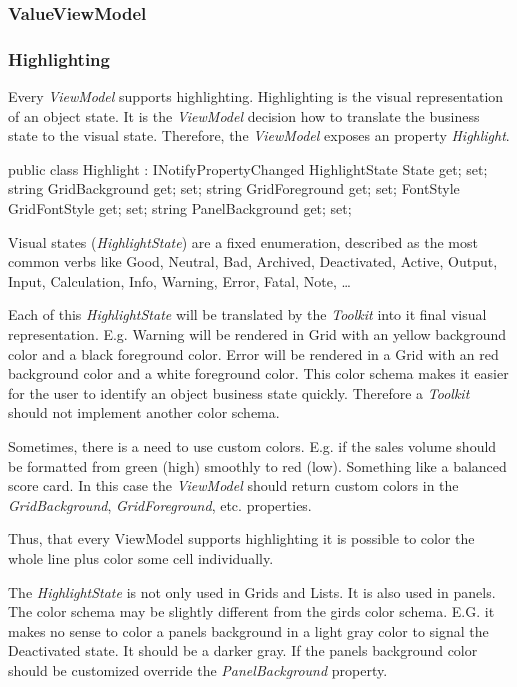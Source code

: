 \subsubsection{ValueViewModel}

\subsubsection{Highlighting}
Every \emph{ViewModel} supports highlighting. Highlighting is the visual
representation of an object state. It is the \emph{ViewModel} decision how to
translate the business state to the visual state. Therefore, the
\emph{ViewModel} exposes an property \emph{Highlight}.

\begin{CS}
public class Highlight : INotifyPropertyChanged
{
    HighlightState State { get; set; }
    string GridBackground { get; set; }
    string GridForeground { get; set; }
    FontStyle GridFontStyle { get; set; }
    string PanelBackground { get; set; }
}
\end{CS}

Visual states (\emph{HighlightState}) are a fixed enumeration, described as the
most common verbs like Good, Neutral, Bad, Archived, Deactivated, Active,
Output, Input, Calculation, Info, Warning, Error, Fatal, Note, \ldots

Each of this \emph{HighlightState} will be translated by the \emph{Toolkit} into
it final visual representation. E.g. Warning will be rendered in Grid with an
yellow background color and a black foreground color. Error will be rendered in
a Grid with an red background color and a white foreground color. This color
schema makes it easier for the user to identify an object business state
quickly. Therefore a  \emph{Toolkit} should not implement another color schema.

Sometimes, there is a need to use custom colors. E.g. if the sales volume should
be formatted from green (high) smoothly to red (low). Something like a balanced
score card. In this case the \emph{ViewModel} should return custom colors in the
\emph{GridBackground}, \emph{GridForeground}, etc. properties.

Thus, that every ViewModel supports highlighting it is possible to color the
whole line plus color some cell individually.

The \emph{HighlightState} is not only used in Grids and Lists. It is also used
in panels. The color schema may be slightly different from the girds color
schema. E.G. it makes no sense to color a panels background in a light gray
color to signal the Deactivated state. It should be a darker gray. If the panels
background color should be customized override the \emph{PanelBackground}
property.


